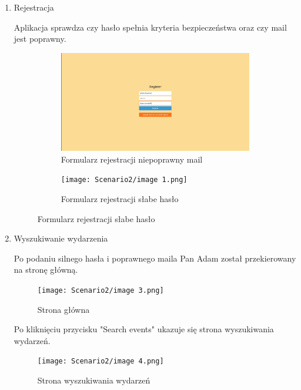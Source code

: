 \documentclass[11pt,a4paper]{article}
\begin{document}
\begin{enumerate}
    \item Rejestracja

    Aplikacja sprawdza czy hasło spełnia kryteria bezpieczeństwa oraz czy mail jest poprawny.

    \begin{figure}[H]
    \centering
    \captionsetup{justification=centering,margin=2cm}
        \begin{subfigure}{0.49\textwidth}
            \includegraphics[width=\textwidth]{Scenario2/image.png}
            \caption{Formularz rejestracji niepoprawny mail}
        \end{subfigure}
    \hfill
        \begin{subfigure}{0.49\textwidth}
            \texttt{[image: Scenario2/image 1.png]}
            \caption{Formularz rejestracji słabe hasło}
        \end{subfigure}
    \end{figure}

    \newpage

    \item Wyszukiwanie wydarzenia

    Po podaniu silnego hasła i poprawnego maila Pan Adam został przekierowany na stronę główną.

    \begin{figure} [H]
    \centering
    \texttt{[image: Scenario2/image 3.png]}
    \caption{Strona główna}
    \end{figure}

    Po kliknięciu przycisku "Search events" ukazuje się strona wyszukiwania wydarzeń.

    \begin{figure} [H]
    \centering
    \texttt{[image: Scenario2/image 4.png]}
    \caption{Strona wyszukiwania wydarzeń}
    \end{figure}


\end{enumerate}
\end{document}

